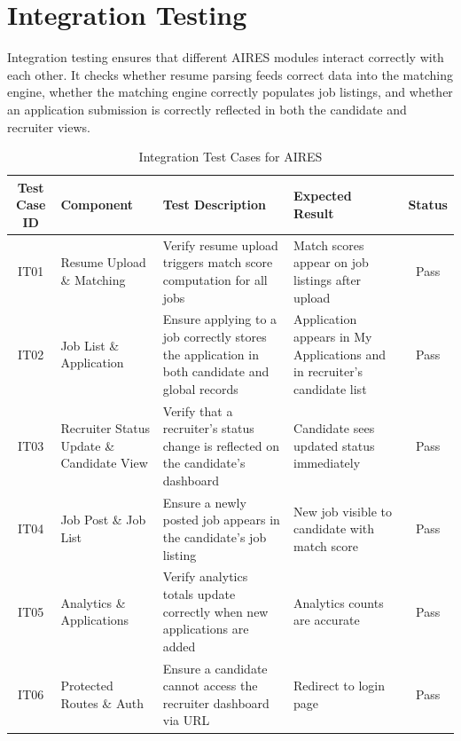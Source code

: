 \newpage
\section{Integration Testing}
Integration testing ensures that different AIRES modules interact correctly with each other. It checks whether resume parsing feeds correct data into the matching engine, whether the matching engine correctly populates job listings, and whether an application submission is correctly reflected in both the candidate and recruiter views.
\FloatBarrier %
\vspace{-10pt} %
\begin{table}[H]
    \centering
    \renewcommand{\arraystretch}{1.3}
    \small
    \begin{tabular}{|c|p{3cm}|p{3cm}|p{3cm}|c|}
        \hline
        \textbf{Test Case ID} & \textbf{Component} & \textbf{Test Description} & \textbf{Expected Result} & \textbf{Status} \\
        \hline
        IT01 & Resume Upload \& Matching & Verify resume upload triggers match score computation for all jobs & Match scores appear on job listings after upload & Pass \\
        \hline
        IT02 & Job List \& Application & Ensure applying to a job correctly stores the application in both candidate and global records & Application appears in My Applications and in recruiter's candidate list & Pass \\
        \hline
        IT03 & Recruiter Status Update \& Candidate View & Verify that a recruiter's status change is reflected on the candidate's dashboard & Candidate sees updated status immediately & Pass \\
        \hline
        IT04 & Job Post \& Job List & Ensure a newly posted job appears in the candidate's job listing & New job visible to candidate with match score & Pass \\
        \hline
        IT05 & Analytics \& Applications & Verify analytics totals update correctly when new applications are added & Analytics counts are accurate & Pass \\
        \hline
        IT06 & Protected Routes \& Auth & Ensure a candidate cannot access the recruiter dashboard via URL & Redirect to login page & Pass \\
        \hline
    \end{tabular}
    \caption{Integration Test Cases for AIRES}
    \label{tab:integration_tests}
\end{table}
\newpage
